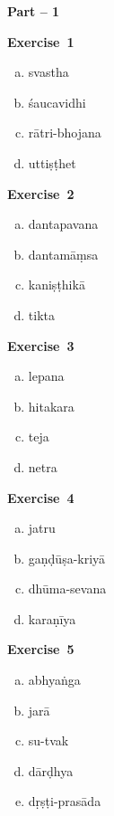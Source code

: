 \centerline{\textbf{Part -- 1}}

\begin{multicols}{2}
\noindent
\textbf{Exercise~1}
\vspace{-10pt}
\begin{enumerate}[a.]
\itemsep=0pt
\item svastha
\item śaucavidhi
\item rātri-bhojana 
\item uttiṣṭhet
\end{enumerate}

\noindent
\textbf{Exercise~2}
\vspace{-10pt}
\begin{enumerate}[a.]
\itemsep=0pt
\item dantapavana
\item dantamāṃsa
\item kaniṣṭhikā
\item tikta
\end{enumerate}

\noindent
\textbf{Exercise~3}
\vspace{-10pt}
\begin{enumerate}[a.]
\itemsep=0pt
\item lepana 
\item hitakara
\item teja
\item netra
\end{enumerate}

\noindent\textbf{Exercise~4}
\vspace{-10pt}
\begin{enumerate}[a.]
\itemsep=0pt
\item jatru
\item gaṇḍūṣa-kriyā
\item dhūma-sevana
\item karaṇīya
\end{enumerate}

\noindent\textbf{Exercise~5}
\vspace{-10pt}
\begin{enumerate}[a.]
\itemsep=0pt
\item abhyaṅga
\item jarā
\item su-tvak
\item dārḍhya
\item dṛṣṭi-prasāda
\end{enumerate}


\end{multicols}
